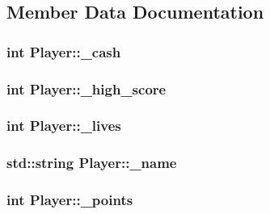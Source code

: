 \subsection{Member Data Documentation}
\hypertarget{class_player_a8a758ff47e7e5eddfd0573ba8ed18c93}{
\subsubsection[{\+\_\+cash}]{\setlength{\rightskip}{0pt plus 5cm}int Player\+::\+\_\+cash\hspace{0.3cm}{\ttfamily [private]}}}\label{class_player_a8a758ff47e7e5eddfd0573ba8ed18c93}
\hypertarget{class_player_a68e5563b8e531a97e921dfe7b297f033}{
\subsubsection[{\+\_\+high\+\_\+score}]{\setlength{\rightskip}{0pt plus 5cm}int Player\+::\+\_\+high\+\_\+score\hspace{0.3cm}{\ttfamily [private]}}}\label{class_player_a68e5563b8e531a97e921dfe7b297f033}
\hypertarget{class_player_a5bcfac185a02c64ba2229deea246a6bb}{
\subsubsection[{\+\_\+lives}]{\setlength{\rightskip}{0pt plus 5cm}int Player\+::\+\_\+lives\hspace{0.3cm}{\ttfamily [private]}}}\label{class_player_a5bcfac185a02c64ba2229deea246a6bb}
\hypertarget{class_player_a488b36bb1ea7cc574050917a584c8721}{
\subsubsection[{\+\_\+name}]{\setlength{\rightskip}{0pt plus 5cm}std\+::string Player\+::\+\_\+name\hspace{0.3cm}{\ttfamily [private]}}}\label{class_player_a488b36bb1ea7cc574050917a584c8721}
\hypertarget{class_player_ab249b2a8f8e1ae378f71d64691586ad9}{
\subsubsection[{\+\_\+points}]{\setlength{\rightskip}{0pt plus 5cm}int Player\+::\+\_\+points\hspace{0.3cm}{\ttfamily [private]}}}\label{class_player_ab249b2a8f8e1ae378f71d64691586ad9}


